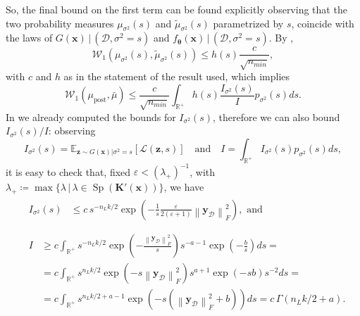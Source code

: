 \documentclass[a4paper, 11pt, reqno]{amsart}
\theoremstyle{plain}
\theoremstyle{remark}
\theoremstyle{definition}
\newcommand{\mean}[2][\kern-0.5pt]{\mathbb{E}_{#1}\left[#2\right]}
\newcommand{\given}{\, | \,}
\newcommand{\wass}[3][2]{\mathcal{W}_{#1}\left(#2, #3\right)}
\newcommand{\real}{\mathbb{R}}
\newcommand{\norm}[1]{\left\lVert#1\right\rVert}
\renewcommand{\exp}[1]{\operatorname{exp}\left(#1\right)}
\let\epsilon\varepsilon
\newcommand{\train}{\mathcal{D}}
\begin{document}
So, the final bound on the first term can be found explicitly observing that the two probability measures $\mu_{\sigma^2}(s)$ and $\widetilde{\mu}_{\sigma^2}(s)$ parametrized by $s$, coincide with the laws of $G(\bm{x}) \given (\train, \sigma^2 = s)$ and $f_{\bm{\theta}}(\bm{x}) \given (\train, \sigma^2 = s)$. 
By , 
\begin{equation*}
	\wass[1]{\mu_{\sigma^2}(s)}{\widetilde{\mu}_{\sigma^2}(s)} \leq h(s) \frac{c}{\sqrt{n_{min}}},
\end{equation*}
with $c$ and $h$ as in the statement of the result used, which implies
\begin{equation} \label{eq:boundfirstterm}
	\wass[1]{\mu_{\mathrm{post}}}{\bar{\mu}} \leq \frac{c}{\sqrt{n_{min}}} \int_{\real^+} h(s) \frac{\mathit{I}_{\sigma^2}(s)}{\mathit{I}} p_{\sigma^2}(s) ds.
\end{equation}
In  we already computed the bounds for $\mathit{I}_{\sigma^2}(s)$, therefore we can also bound $\mathit{I}_{\sigma^2}(s) / \mathit{I}$: observing 
\begin{equation*}
	\mathit{I}_{\sigma^2}(s) = \mean[\bm{z} \sim G(\bm{x}) | \sigma^2 = s]{\mathcal{L}(\bm{z}, s)} \quad \text{and} \quad \mathit{I} = \int_{\real^+} \mathit{I}_{\sigma^2}(s) p_{\sigma^2}(s) ds,
\end{equation*}
it is easy to check that, fixed $\epsilon < \left(\lambda_+\right)^{-1}$, with $\lambda_+ \coloneqq \max\{\lambda \given \lambda \in \operatorname{Sp}\left(\bm{K}'(\bm{x})\right)\}$, we have
\begin{align}	
	& \begin{aligned} \nonumber
		\mathit{I}_{\sigma^2}(s) & \leq c \, s^{-n_L k / 2} \exp{-\frac{1}{s} \frac{\epsilon}{2 (\epsilon + 1)} \norm{\bm{y}_{\mathcal{D}}}_F^2}, \text{ and} \\
	\end{aligned} \\
	& \begin{aligned} \label{eq:lowerboundI}
		\mathit{I} & \geq c \int_{\real^+} s^{- n_L k / 2} \exp{-\frac{\norm{\bm{y}_{\mathcal{D}}}_F^2}{s}} s^{- a - 1} \exp{-\frac{b}{s}} ds = \\
		& = c \int_{\real^+} s^{n_L k / 2} \exp{- s \norm{\bm{y}_{\mathcal{D}}}_F^2} s^{a + 1} \exp{- s b} s^{-2} ds = \\
		& = c \int_{\real^+} s^{n_L k / 2 + a - 1} \exp{- s (\norm{\bm{y}_{\mathcal{D}}}_F^2 + b)} ds = c \, \Gamma\left(n_L k /  2 + a\right).
	\end{aligned}
\end{align}
\end{document}
